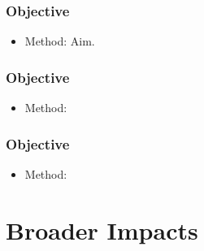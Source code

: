 \documentclass[12pt, oneside]{article}
\begin{document}
\subsubsection{Objective}
\begin{itemize}
 \item Method:
 Aim.
\end{itemize}

\subsubsection{Objective}
\begin{itemize}
 \item Method:
\end{itemize}

\subsubsection{Objective}
\begin{itemize}
 \item Method:
\end{itemize}


\section{Broader Impacts}



\end{document}
